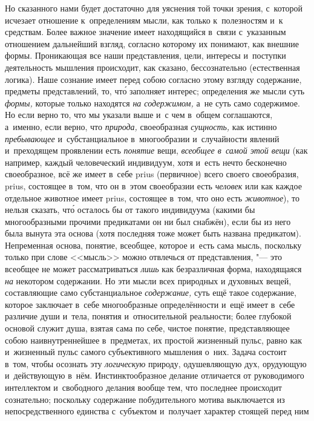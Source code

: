 Но сказанного нами будет достаточно для уяснения той точки зрения, с~которой
исчезает отношение к~определениям мысли, как только к~полезностям и~к
средствам. Более важное значение имеет находящийся в~связи с~указанным
отношением дальнейший взгляд, согласно которому их понимают, как внешние формы.
Проникающая все наши представления, цели, интересы и~поступки деятельность
мышления происходит, как сказано, бессознательно (естественная логика). Наше
сознание имеет перед собою согласно этому взгляду содержание, предметы
представлений, то, чт\'{о} заполняет интерес; определения же мысли суть
{\em формы,} которые только находятся {\em на содержимом,} а~не суть само
содержимое. Но если верно то, что мы указали выше и~с чем в~общем соглашаются,
а~именно, если верно, что {\em природа,} своеобразная {\em сущность,} как
истинно {\em пребывающее} и~субстанциальное в~многообразии и~случайности
явлений и~преходящем проявлении есть {\em понятие} вещи, {\em всеобщее в~самой
этой вещи} (как например, каждый человеческий индивидуум, хотя и~есть нечто
бесконечно своеобразное, всё же имеет в~себе prius (первичное) всего своего
своеобразия, prius, состоящее в~том, что он в~этом своеобразии есть
{\em человек} или как каждое отдельное животное имеет prius, состоящее в~том,
что оно есть {\em животное}), то нельзя сказать, чт\'{о} осталось бы от такого
индивидуума (какими бы многообразными прочими предикатами он ни был снабжён),
если бы из него была вынута эта основа (хотя последняя тоже может быть названа
предикатом). Непременная основа, понятие, всеобщее, которое и~есть сама мысль,
поскольку только при слове <<мысль>> можно отвлечься от представления, "--- это
всеобщее не может рассматриваться {\em лишь} как безразличная форма,
находящаяся {\em на} некотором содержании. Но эти мысли всех природных и
духовных вещей, составляющие само субстанциальное {\em содержание,} суть ещё
такое содержание, которое заключает в~себе многообразные определённости и~ещё
имеет в~себе различие души и~тела, понятия и~относительной реальности; более
глубокой основой служит душа, взятая сама по себе, чистое понятие,
представляющее собою наивнутреннейшее в~предметах, их простой жизненный пульс,
равно как и~жизненный пульс самого субъективного мышления о~них. Задача состоит
в~том, чтобы осознать эту {\em логическую} природу, одушевляющую дух, орудующую
и~действующую в~нём. Инстинктообразное делание отличается от руководимого
интеллектом и~свободного делания вообще тем, что последнее происходит
сознательно; поскольку содержание побудительного мотива выключается из
непосредственного единства с~субъектом и~получает характер стоящей перед ним
